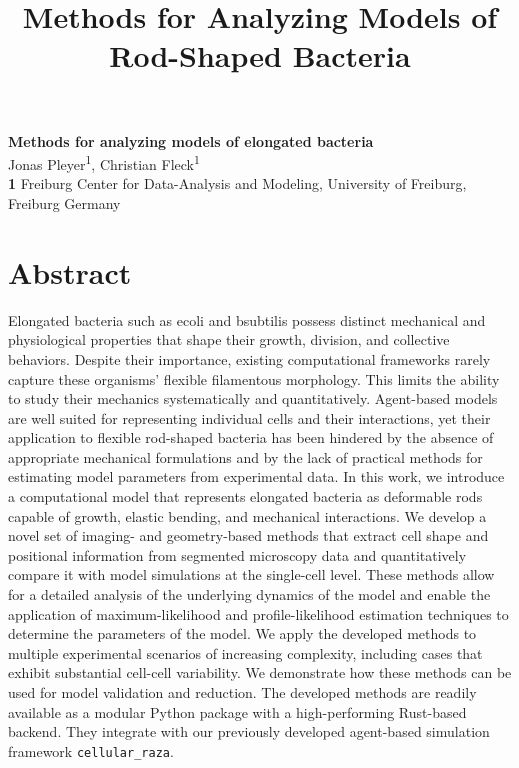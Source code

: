 \documentclass[10pt,letterpaper]{article}
\title{Methods for Analyzing Models of\\ Rod-Shaped Bacteria}
\begin{document}
\begin{flushleft}
{\Large
\textbf{Methods for analyzing models of elongated bacteria}
}
\newline
\\
Jonas Pleyer\textsuperscript{1}, Christian Fleck\textsuperscript{1}\\
\bigskip
\textbf{1} Freiburg Center for Data-Analysis and Modeling, University of Freiburg, Freiburg Germany
\\
\bigskip



\end{flushleft}


\section*{Abstract}
Elongated bacteria such as \acl{ecoli} and \acl{bsubtilis} possess distinct mechanical
and physiological properties that shape their growth, division, and collective behaviors.
Despite their importance, existing computational frameworks rarely capture these organisms'
flexible filamentous morphology.
This limits the ability to study their mechanics systematically and quantitatively.
Agent-based models are well suited for representing individual cells and their interactions, yet
their application to flexible rod-shaped bacteria has been hindered by the absence of appropriate
mechanical formulations and by the lack of practical methods for estimating model parameters from
experimental data.
In this work, we introduce a computational model that represents elongated bacteria as deformable
rods capable of growth, elastic bending, and mechanical interactions.
We develop a novel set of imaging- and geometry-based methods that extract cell shape and positional
information from segmented microscopy data and quantitatively compare it with model simulations at
the single-cell level.
These methods allow for a detailed analysis of the underlying dynamics of the model and enable the
application of maximum-likelihood and profile-likelihood estimation techniques to determine
the parameters of the model. We apply the developed methods to multiple experimental scenarios of
increasing complexity, including cases that
exhibit substantial cell-cell variability.
We demonstrate how these methods can be used for model validation and reduction.
The developed methods are readily available as a modular Python package with a high-performing
Rust-based backend.
They integrate with our previously developed agent-based simulation framework \texttt{cellular\_raza}.
\end{document}
